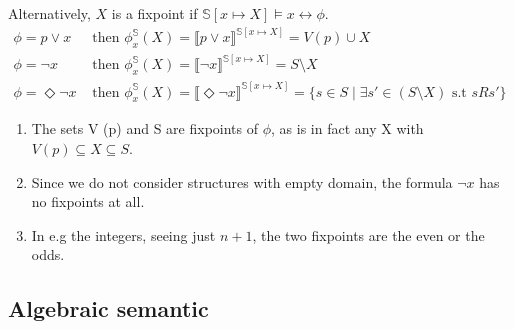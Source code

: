 Alternatively, $X$ is a fixpoint if $\mathbb{S}[x\mapsto X] \models x \leftrightarrow \phi$.
\begin{align*}
\phi = p \lor x & \text{ then } \phi_{x}^{\mathbb{S}}(X) = \llbracket p \lor x
\rrbracket^{\mathbb{S}[x \mapsto X]} = V(p) \cup X\\
\phi = \neg x & \text{ then } \phi_{x}^{\mathbb{S}}(X) = \llbracket \neg x
\rrbracket^{\mathbb{S}[x \mapsto X]} = S \setminus X\\
\phi = \Diamond \neg x & \text{ then } \phi_{x}^{\mathbb{S}}(X) = \llbracket \Diamond \neg x
\rrbracket^{\mathbb{S}[x \mapsto X]} =  \{s \in S \mid \exists s' \in (S \setminus X) \text{ s.t } sRs' \} 
\end{align*}
\begin{enumerate}
\item The sets V (p) and S are fixpoints of $\phi$, as is in fact any X with $V (p) \subseteq X \subseteq S$.
\item  Since we do not consider structures with empty domain, the formula $\neg x$ has no
fixpoints at all. 
\item In e.g the integers, seeing just $n+1$, the two fixpoints are the even or the odds.
\end{enumerate}


\subsection{Algebraic semantic}
\label{sec:algebraic-semantic}

